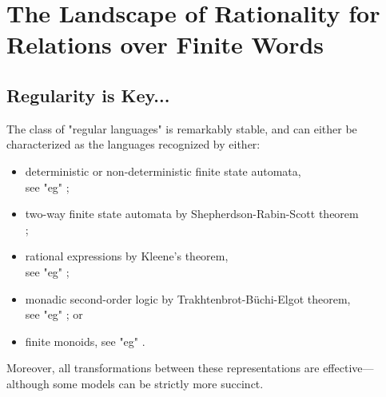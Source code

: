 \section{The Landscape of Rationality for Relations over Finite Words}
\label{sec:preliminaries-automatic-structures-relations}

\subsection{Regularity is Key...}

The class of "regular languages" is remarkably stable, and can either be characterized as the 
languages recognized by either:
\begin{itemize}
	\item deterministic or non-deterministic finite state automata,\\
		\null\hspace{1.0pc}see "eg" \cite[Proposition~1.2.3, p.~7]{Pin2021FiniteAutomata};
	\item two-way finite state automata by Shepherdson-Rabin-Scott theorem\\
		\null\hspace{1.0pc}\cite[Theorem~2, p.~198]{Shepherdson1959ReductionTwoWay}
		\cite[Theorem~15, p.~123]{RabinScott1959FiniteAutomata};
	\item rational expressions by Kleene's theorem,\\
		\null\hspace{1.0pc}see "eg" \cite[Theorem~1.5.11, p.~34]{Pin2021FiniteAutomata};
	\item monadic second-order logic by Trakhtenbrot-Büchi-Elgot theorem,\\
		\null\hspace{1.0pc}see "eg" \cite[Theorem~2.2, p.~32]{Bojanczyk2020MSO}; or
	\item finite monoids, see "eg" \cite[\S~1.4.2, p.~19]{Pin2021FiniteAutomata}.
\end{itemize}
Moreover, all transformations between these representations are effective---although some
models can be strictly more succinct.

